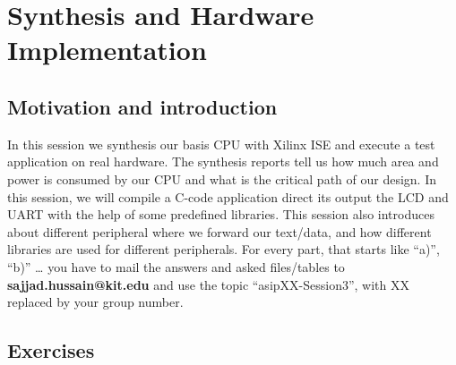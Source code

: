 \hypertarget{synthesis-and-hardware-implementation}{%
\chapter*{Synthesis and Hardware Implementation}\label{synthesis-and-hardware-implementation}}


\section*{Motivation and introduction}

In this session we synthesis our basis CPU with Xilinx ISE and execute a
test application on real hardware. The synthesis reports tell us how
much area and power is consumed by our CPU and what is the critical path
of our design. In this session, we will compile a C-code application
direct its output the LCD and UART with the help of some predefined
libraries. This session also introduces about different peripheral where
we forward our text/data, and how different libraries are used for
different peripherals. For every part, that starts like ``a)'', ``b)''
\ldots{} you have to mail the answers and asked files/tables to
\textbf{sajjad.hussain@kit.edu} and use the topic ``asipXX-Session3'',
with XX replaced by your group number.

\section*{Exercises}

